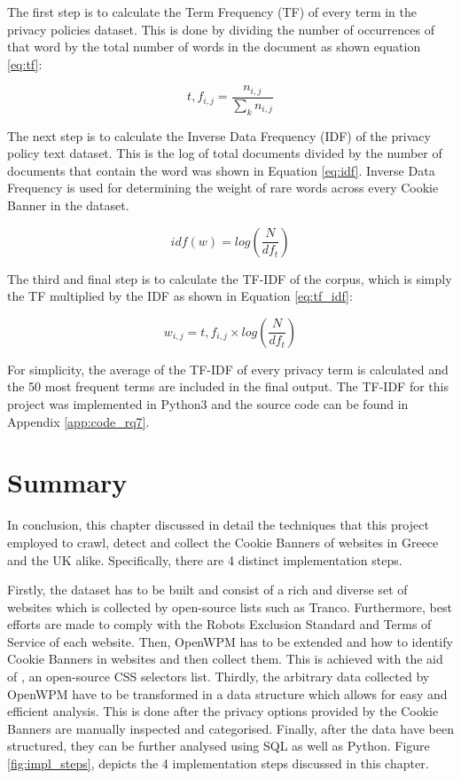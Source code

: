 \documentclass[../main.tex]{subfiles}
\begin{document}
The first step is to calculate the Term Frequency (TF) of every term in the privacy policies dataset. This is done by dividing the number of occurrences of that word by the total number of words in the document as shown equation \ref{eq:tf}:

\begin{equation}
    t,f_{i,j} = \frac{n_{i,j}}{\sum_{k}^{} n_{i,j}}
    \label{eq:tf}
\end{equation}

The next step is to calculate the Inverse Data Frequency (IDF) of the privacy policy text dataset. This is the log of total documents divided by the number of documents that contain the word was shown in Equation \ref{eq:idf}. Inverse Data Frequency is used for determining the weight of rare words across every Cookie Banner in the dataset.

\begin{equation}
    idf(w) = log(\frac{N}{df_t})
    \label{eq:idf}
\end{equation}

The third and final step is to calculate the TF-IDF of the corpus, which is simply the TF multiplied by the IDF as shown in Equation \ref{eq:tf_idf}:

\begin{equation}
    w_{i,j} = t,f_{i,j} \times log(\frac{N}{df_t})
    \label{eq:tf_idf}
\end{equation}

For simplicity, the average of the TF-IDF of every privacy term is calculated and the 50 most frequent terms are included in the final output. The TF-IDF for this project was implemented in Python3 and the source code can be found in Appendix \ref{app:code_rq7}.

\section{Summary}
In conclusion, this chapter discussed in detail the techniques that this project employed to crawl, detect and collect the Cookie Banners of websites in Greece and the UK alike. Specifically, there are 4 distinct implementation steps.

Firstly, the dataset has to be built and consist of a rich and diverse set of websites which is collected by open-source lists such as Tranco. Furthermore, best efforts are made to comply with the Robots Exclusion Standard and Terms of Service of each website. Then, OpenWPM has to be extended and  how to identify Cookie Banners in websites and then collect them. This is achieved with the aid of , an open-source CSS selectors list. Thirdly, the arbitrary data collected by OpenWPM have to be transformed in a data structure which allows for easy and efficient analysis. This is done after the privacy options provided by the Cookie Banners are manually inspected and categorised.  Finally, after the data have been structured, they can be further analysed using SQL as well as Python. Figure \ref{fig:impl_steps}, depicts the 4 implementation steps discussed in this chapter.
\end{document}
